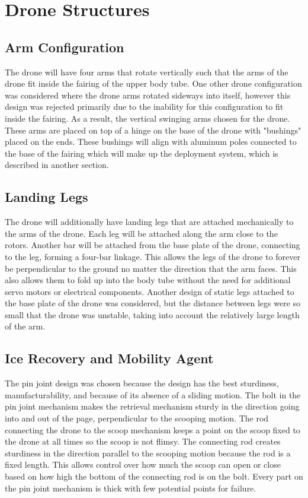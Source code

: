 	\section{Drone Structures}\label{PL:Design:Structures}
		\subsection{Arm Configuration}
			The drone will have four arms that rotate vertically such that the arms of the drone fit inside the fairing of the upper body tube. One other drone configuration was considered where the drone arms rotated sideways into itself, however this design was rejected primarily due to the inability for this configuration to fit inside the fairing. As a result, the vertical swinging arms chosen for the drone. These arms are placed on top of a hinge on the base of the drone with "bushings" placed on the ends. These bushings will align with aluminum poles connected to the base of the fairing which will make up the deployment system, which is described in another section.

		\subsection{Landing Legs}
			The drone will additionally have landing legs that are attached mechanically to the arms of the drone. Each leg will be attached along the arm close to the rotors. Another bar will be attached from the base plate of the drone, connecting to the leg, forming a four-bar linkage. This allows the legs of the drone to forever be perpendicular to the ground no matter the direction that the arm faces. This also allows them to fold up into the body tube without the need for additional servo motors or electrical components. Another design of static legs attached to the base plate of the drone was considered, but the distance between legs were so small that the drone was unstable, taking into account the relatively large length of the arm.
	
		\subsection{Ice Recovery and Mobility Agent}
		The pin joint design was chosen because the design has the best sturdiness, manufacturability, and because of its absence of a sliding motion. The bolt in the pin joint mechanism makes the retrieval mechanism sturdy in the direction going into and out of the page, perpendicular to the scooping motion. The rod connecting the drone to the scoop mechanism keeps a point on the scoop fixed to the drone at all times so the scoop is not flimsy. The connecting rod creates sturdiness in the direction parallel to the scooping motion because the rod is a fixed length. This allows control over how much the scoop can open or close based on how high the bottom of the connecting rod is on the bolt. Every part on the pin joint mechanism is thick with few potential points for failure. 

